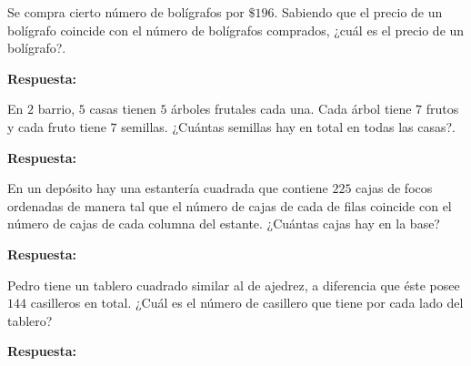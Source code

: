 \documentclass[12pt]{examdesign}
\theoremstyle{plain}
\theoremstyle{definition}
\theoremstyle{remark}
\begin{document}
	\begin{shortanswer}[title={Leemos el material de consulta y resolvemos las siguientes situaciones problemáticas.}, rearrange=no]
    	\begin{question}
    		Se compra cierto número de bolígrafos por $\$196$. Sabiendo que el precio de un bolígrafo coincide con el número de bolígrafos comprados, ¿cuál es el precio de un bolígrafo?.
    		
    	    \begin{answer}
    	    	\textbf{Respuesta:}
    	    \end{answer}
    	\end{question}
    	
    	\begin{question}
    		En $2$ barrio, $5$ casas tienen $5$ árboles frutales cada una. Cada árbol tiene $7$ frutos y cada fruto tiene $7$ semillas. ¿Cuántas semillas hay en total en todas las casas?.
    		
    	    \begin{answer}
    	    	\textbf{Respuesta:}
    	    \end{answer}
    	\end{question}
    	
    	\begin{question}
    	    En un depósito hay una estantería cuadrada que contiene $225$ cajas de focos ordenadas de manera tal que el número de cajas de cada de filas coincide con el número de cajas de cada columna del estante. ¿Cuántas cajas hay en la base?
    		
    	    \begin{answer}
    	    	\textbf{Respuesta:}
    	    \end{answer}
    	\end{question}
    	
    	\begin{question}
    	    Pedro tiene un tablero cuadrado similar al de ajedrez, a diferencia que éste posee $144$ casilleros en total. ¿Cuál es el número de casillero que tiene por cada lado del tablero?
    		
    	    \begin{answer}
    	    	\textbf{Respuesta:}
    	    \end{answer}
    	\end{question}
    	
    \end{shortanswer}
\end{document}

